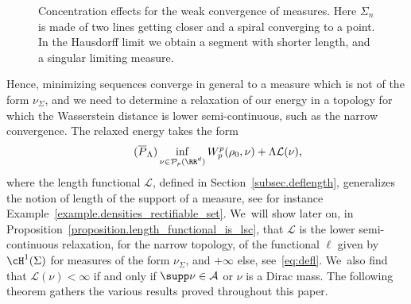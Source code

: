 \begin{figure}[t]
{
}
\caption{Concentration effects for the weak convergence of measures. Here $\Sigma_n$ is made of two lines getting closer and a spiral converging to a point. In the Hausdorff limit we obtain a segment with shorter length, and a singular limiting measure.}\label{figure.concentration_sets_measure}
\vspace*{-.1\baselineskip}
\end{figure}

Hence, minimizing sequences converge in general to a measure which is
not of the form $\nu_\Sigma$, and we need to determine a relaxation of our energy in a topology for which the Wasserstein distance is lower semi-continuous, such as the narrow convergence.
The relaxed energy takes the form
\begin{equation}\label{problem.shape_optimization_relaxed}
\tag{$\overline{P}_\Lambda$}
\inf_{
\substack{
\nu \in \mathcal{P}_p(\RR^d)
}
}
W_p^p(\rho_0, \nu) + \Lambda \mathcal{L}(\nu),
\end{equation}
where the length functional $\mathcal{L}$, defined in Section~\ref{subsec.deflength}, generalizes the notion of length of the support of a measure, see for instance Example~\ref{example.densities_rectifiable_set}. We~will show later on, in Proposition~\ref{proposition.length_functional_is_lsc},
that $\mathcal{L}$ is the lower semi-continuous relaxation, for the narrow topology, of the functional $\ell$ given by $\cH^1(\Sigma)$ for measures
of the form $\nu_\Sigma$, and $+\infty$ else, see~\eqref{eq:defl}. We~also find that $\mathcal{L}(\nu) < \infty$ if and only if $\supp \nu \in \mathcal{A}$ or $\nu$ is a Dirac mass. The following theorem gathers the various results proved throughout this paper.

